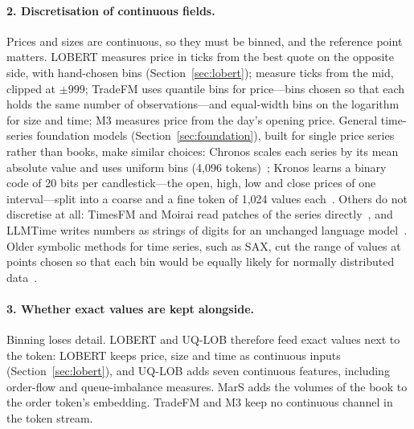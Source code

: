 \paragraph{2. Discretisation of continuous fields.} Prices and sizes are continuous, so they must be
binned, and the reference point matters. LOBERT measures price in ticks from the best quote on the opposite
side, with hand-chosen bins (Section~\ref{sec:lobert}); \citet{nagy2023} measure ticks from the mid, clipped at $\pm 999$;
TradeFM uses quantile bins for price---bins chosen so that each holds the same number of observations---and
equal-width bins on the logarithm for size and time; M3 measures price from the day's opening price. General
time-series foundation models (Section~\ref{sec:foundation}), built for single price series rather than books, make
similar choices: Chronos scales each series by its mean absolute value and uses uniform bins (4{,}096 tokens)~\citep{chronos2024};
Kronos learns a binary code of 20 bits per candlestick---the open, high, low and close prices of one interval---split into a coarse and a fine token of 1{,}024 values
each~\citep{kronos2025}. Others do not discretise at all: TimesFM and Moirai read patches of the series
directly~\citep{timesfm2024,moirai2024}, and LLMTime writes numbers as strings of digits for an unchanged
language model~\citep{gruver2023llmtime}. Older symbolic methods for time series, such as SAX, cut the range of values at points chosen so that each bin
would be equally likely for normally distributed data~\citep{lin2003sax,lin2007sax}.

\paragraph{3. Whether exact values are kept alongside.} Binning loses detail. LOBERT and UQ-LOB therefore
feed exact values next to the token: LOBERT keeps price, size and time as continuous inputs
(Section~\ref{sec:lobert}), and UQ-LOB adds seven continuous features, including order-flow and queue-imbalance
measures. MarS adds the volumes of the book to the order token's embedding. TradeFM and M3 keep no
continuous channel in the token stream.

